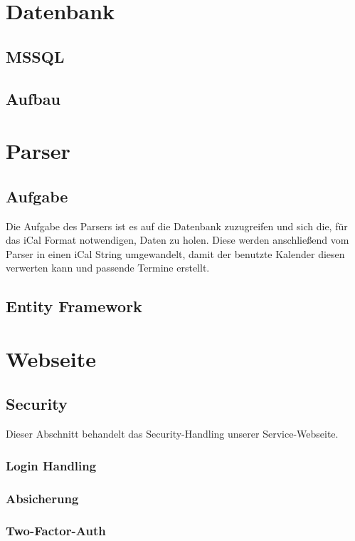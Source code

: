 \documentclass[11pt]{scrartcl}
\begin{document}
\section{Datenbank}
\label{sec:datenbank}
\subsection{MSSQL}
\label{sec:db-mssql}
\subsection{Aufbau}
\label{sec:db-aufbau}

\section{Parser}
\label{sec:parser}
\subsection{Aufgabe}
\label{sec:parser-aufgabe}
Die Aufgabe des Parsers ist es auf die Datenbank zuzugreifen und sich die, für das iCal Format notwendigen, Daten zu holen. Diese werden anschließend vom Parser in einen iCal String umgewandelt, damit der benutzte Kalender diesen verwerten kann und passende Termine erstellt. 

\subsection{Entity Framework}
\label{sec:parser-entity-framework}

\section{Webseite}
\label{sec:Webseite}
\subsection{Security}
\label{sec:Security}
Dieser Abschnitt behandelt das Security-Handling unserer Service-Webseite.
\subsubsection{Login Handling}
\label{sec:Login}
\subsubsection{Absicherung}
\label{sec:Absicherung}
\subsubsection{Two-Factor-Auth}
\label{sec:tfa}
\end{document}
